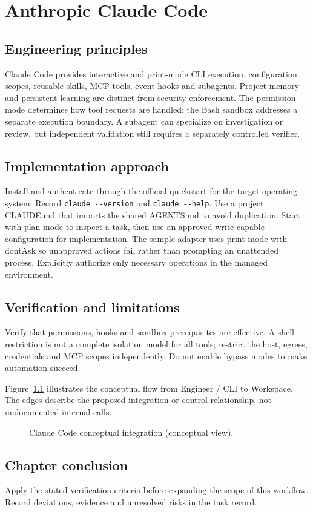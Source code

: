\chapter{Anthropic Claude Code}

\section{Engineering principles}

Claude Code provides interactive and print-mode CLI execution, configuration scopes, reusable skills, MCP tools, event hooks and subagents. Project memory and persistent learning are distinct from security enforcement. The permission mode determines how tool requests are handled; the Bash sandbox addresses a separate execution boundary. A subagent can specialize on investigation or review, but independent validation still requires a separately controlled verifier.

\section{Implementation approach}

Install and authenticate through the official quickstart for the target operating system. Record \texttt{claude -{}-version} and \texttt{claude -{}-help}. Use a project CLAUDE.md that imports the shared AGENTS.md to avoid duplication. Start with plan mode to inspect a task, then use an approved write-capable configuration for implementation. The sample adapter uses print mode with dontAsk so unapproved actions fail rather than prompting an unattended process. Explicitly authorize only necessary operations in the managed environment.

\section{Verification and limitations}

Verify that permissions, hooks and sandbox prerequisites are effective. A shell restriction is not a complete isolation model for all tools; restrict the host, egress, credentials and MCP scopes independently. Do not enable bypass modes to make automation succeed.

Figure~\ref{fig:d4} illustrates the conceptual flow from Engineer / CLI to Workspace. The edges describe the proposed integration or control relationship, not undocumented internal calls.

\begin{figure}[htbp]\centering\caption{Claude Code conceptual integration (conceptual view).}\label{fig:d4}\end{figure}

\section{Chapter conclusion}

Apply the stated verification criteria before expanding the scope of this workflow. Record deviations, evidence and unresolved risks in the task record.
